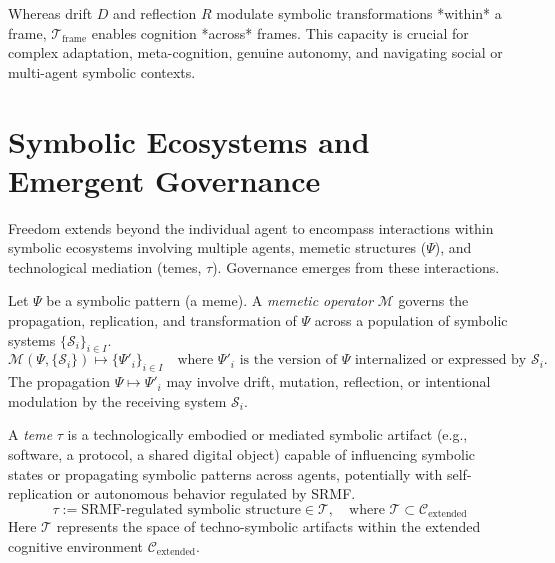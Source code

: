 \begin{remark}
\label{remark:bk9_cross_modality_cognition}
Whereas drift $D$ and reflection $R$ modulate symbolic transformations *within* a frame, $\mathcal{T}_{\text{frame}}$ enables cognition *across* frames. This capacity is crucial for complex adaptation, meta-cognition, genuine autonomy, and navigating social or multi-agent symbolic contexts.
\end{remark}
\section{Symbolic Ecosystems and Emergent Governance}
\label{sec:bk9_symbolic_ecosystems_and_emergent_governance}
Freedom extends beyond the individual agent to encompass interactions within symbolic ecosystems involving multiple agents, memetic structures ($\Psi$), and technological mediation (temes, $\tau$). Governance emerges from these interactions.
\begin{definition}
\label{definition:bk9_memetic_operator}
Let $\Psi$ be a symbolic pattern (a meme). A \emph{memetic operator} $\mathcal{M}$ governs the propagation, replication, and transformation of $\Psi$ across a population of symbolic systems $\{\mathcal{S}_i\}_{i \in I}$.
\[
\mathcal{M}(\Psi, \{\mathcal{S}_i\}) \mapsto \{\Psi'_i\}_{i \in I} \quad \text{where } \Psi'_i \text{ is the version of } \Psi \text{ internalized or expressed by } \mathcal{S}_i.
\]
The propagation $\Psi \mapsto \Psi'_i$ may involve drift, mutation, reflection, or intentional modulation by the receiving system $\mathcal{S}_i$.
\end{definition}
\begin{definition}
\label{definition:bk9_temetic_artifact}
A \emph{teme} $\tau$ is a technologically embodied or mediated symbolic artifact (e.g., software, a protocol, a shared digital object) capable of influencing symbolic states or propagating symbolic patterns across agents, potentially with self-replication or autonomous behavior regulated by SRMF.
\[
\tau := \text{SRMF-regulated symbolic structure} \in \mathcal{T}, \quad \text{where } \mathcal{T} \subset \mathcal{C}_{\text{extended}}
\]
Here $\mathcal{T}$ represents the space of techno-symbolic artifacts within the extended cognitive environment $\mathcal{C}_{\text{extended}}$.
\end{definition}
